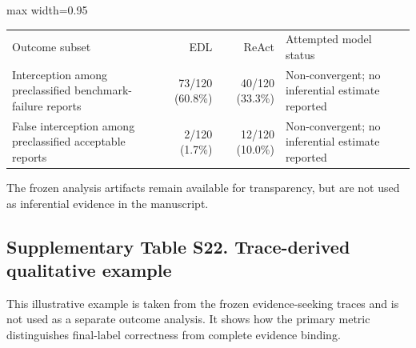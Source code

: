 \documentclass[
  8pt,
]{extarticle}
\begin{document}
\begin{center}
\begin{adjustbox}{max width=0.95\textwidth}
\begin{tabular}{@{}
lrrl@{}}
\toprule\noalign{}
Outcome subset & EDL & ReAct & Attempted model status \\

Interception among preclassified benchmark-failure reports & 73/120
(60.8\%) & 40/120 (33.3\%) & Non-convergent; no inferential estimate
reported \\
False interception among preclassified acceptable reports & 2/120
(1.7\%) & 12/120 (10.0\%) & Non-convergent; no inferential estimate
reported \\
\bottomrule
\end{tabular}
\end{adjustbox}
\end{center}

The frozen analysis artifacts remain available for transparency, but are
not used as inferential evidence in the manuscript.

\hypertarget{supplementary-table-s22-trace-derived-qualitative-example}{%
\subsection{Supplementary Table S22. Trace-derived qualitative
example}\label{supplementary-table-s22-trace-derived-qualitative-example}}

This illustrative example is taken from the frozen evidence-seeking
traces and is not used as a separate outcome analysis. It shows how the
primary metric distinguishes final-label correctness from complete
evidence binding.
\end{document}
